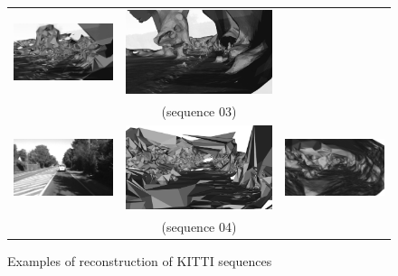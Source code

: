 \begin{figure}[tp]
\begin{tabular}{ccc}
\includegraphics[height=0.18\textwidth]{./img/ch-incr-dens/03ainit00}&
\includegraphics[height=0.18\textwidth]{./img/ch-incr-dens/03aref00}\\
&(sequence 03)&\\
\includegraphics[height=0.18\textwidth]{./img/ch-incr-dens/04aorig00}&
\includegraphics[height=0.18\textwidth]{./img/ch-incr-dens/04ainit00}&
\includegraphics[height=0.18\textwidth]{./img/ch-incr-dens/04aref00}\\
&(sequence 04)&\\
\end{tabular}
\caption{Examples of reconstruction of KITTI sequences }
\label{fig:kitti}
\end{figure}



